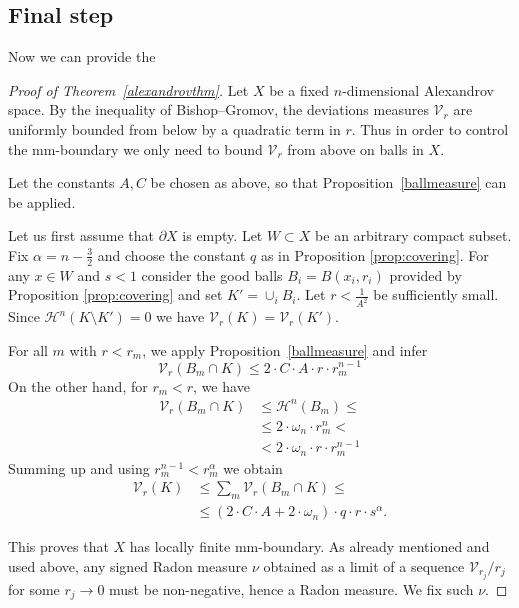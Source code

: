 \documentclass[12pt,leqno,intlimits]{amsart}
\numberwithin{equation}{section}
\theoremstyle{definition}
\theoremstyle{remark}
\newcommand{\pref}[1]{Proposition~\ref{#1}}
\begin{document}
\subsection{Final step}
Now we can provide the
\begin{proof}[Proof of Theorem~\ref{alexandrovthm}]
Let $X$ be a fixed $n$-dimensional Alexandrov space. By the inequality of Bishop--Gromov, the deviations measures $\mathcal{V}_r$ are uniformly bounded from below
by a quadratic term in $r$.
Thus in order to control the mm-boundary we only need to bound $\mathcal{V}_r$ from above on balls in $X$.

Let the constants $A,C$ be chosen as above, so that \pref{ballmeasure} can be applied.

Let us first assume that $\partial X$ is empty.
Let $W\subset X$ be an arbitrary compact subset.
Fix $\alpha =n-\tfrac 3 2$ and choose the constant $q$ as in Proposition \ref{prop:covering}.
For any $x\in W$ and $s<1$ consider the good balls $B_i=B (x_i,{r_i})$ provided by Proposition \ref{prop:covering} and set $K'=\cup _i B_i$. Let $r<\frac 1 {A^2}$ be sufficiently small. Since $\mathcal H^n (K\setminus K')=0$
we have $ \mathcal{V}_r (K)=\mathcal{V}_r (K')$.

For all $m$ with $r<r_m$, we apply \pref{ballmeasure} and infer
$$\mathcal{V}_r(B_m \cap K)\le 2\cdot C\cdot A \cdot r\cdot r_m^{n-1} $$
On the other hand, for $r_m<r$, we have
\begin{align*}
\mathcal{V}_r (B_m\cap K)
&\leq \mathcal H^n (B_m) \leq
\\ &\leq
2 \cdot \omega _n \cdot r_m ^n <
\\ &<2\cdot \omega_n \cdot r \cdot r_m ^{n-1}
\end{align*}
Summing up and using $r_m^{n-1} < r_m ^{\alpha}$ we obtain
\begin{equation} \label{eq:density}
\begin{aligned}
\mathcal{V}_r (K)
&\leq \sum_m \mathcal{V}_r (B_m \cap K) \leq
\\&\leq
(2\cdot C\cdot A+2\cdot \omega _n) \cdot q\cdot r \cdot s^{\alpha}  .
\end{aligned}
\end{equation}

This proves that $X$ has locally finite mm-boundary.
As already mentioned and used above, any signed Radon measure $\nu$ obtained as a limit of a sequence $\mathcal{V}_{r_j} /r_j$ for some $r_j\to 0$ must be non-negative, hence a Radon measure. We fix such $\nu$.


\end{proof}
\end{document}
